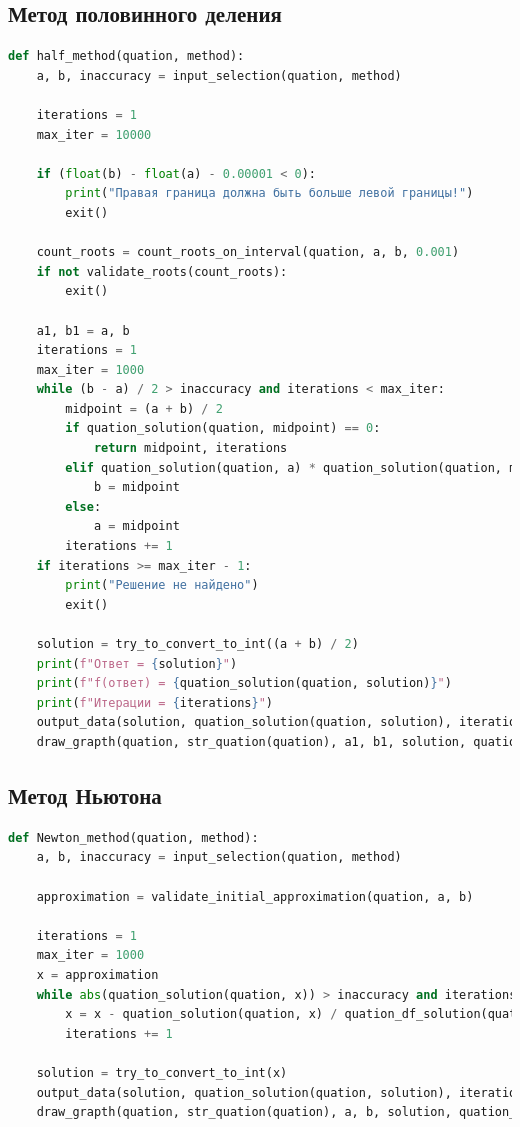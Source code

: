 \documentclass[a4paper,12pt]{article}
\begin{document}
\subsection*{Метод половинного деления}
\begin{lstlisting}[language=Python, caption=Листинг: Метод половинного деления]
def half_method(quation, method):
    a, b, inaccuracy = input_selection(quation, method)

    iterations = 1
    max_iter = 10000

    if (float(b) - float(a) - 0.00001 < 0):
        print("Правая граница должна быть больше левой границы!")
        exit()

    count_roots = count_roots_on_interval(quation, a, b, 0.001)
    if not validate_roots(count_roots):
        exit()

    a1, b1 = a, b
    iterations = 1
    max_iter = 1000
    while (b - a) / 2 > inaccuracy and iterations < max_iter:
        midpoint = (a + b) / 2
        if quation_solution(quation, midpoint) == 0:
            return midpoint, iterations
        elif quation_solution(quation, a) * quation_solution(quation, midpoint) < 0:
            b = midpoint
        else:
            a = midpoint
        iterations += 1
    if iterations >= max_iter - 1:
        print("Решение не найдено")
        exit()

    solution = try_to_convert_to_int((a + b) / 2)
    print(f"Ответ = {solution}")
    print(f"f(ответ) = {quation_solution(quation, solution)}")
    print(f"Итерации = {iterations}")
    output_data(solution, quation_solution(quation, solution), iterations, str_quation(quation))
    draw_grapth(quation, str_quation(quation), a1, b1, solution, quation_solution(quation, solution))
\end{lstlisting}

\subsection*{Метод Ньютона}
\begin{lstlisting}[language=Python, caption=Листинг: Метод Ньютона]
def Newton_method(quation, method):
    a, b, inaccuracy = input_selection(quation, method)

    approximation = validate_initial_approximation(quation, a, b)

    iterations = 1
    max_iter = 1000
    x = approximation
    while abs(quation_solution(quation, x)) > inaccuracy and iterations < max_iter:
        x = x - quation_solution(quation, x) / quation_df_solution(quation, x)
        iterations += 1

    solution = try_to_convert_to_int(x)
    output_data(solution, quation_solution(quation, solution), iterations, str_quation(quation))
    draw_grapth(quation, str_quation(quation), a, b, solution, quation_solution(quation, solution))
\end{lstlisting}
\end{document}
